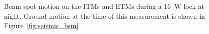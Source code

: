 \begin{figure}
\begin{centering}
\caption[Beam spot motion on the ITMs and ETMs during a 16~W
lock]{Beam spot motion on the ITMs and ETMs during a 16~W lock at
  night. Ground motion at the time of this measurement is shown in
  Figure~\ref{fig:seismic_bsm}}%
\label{fig:bsm}
\end{centering}
\end{figure}



